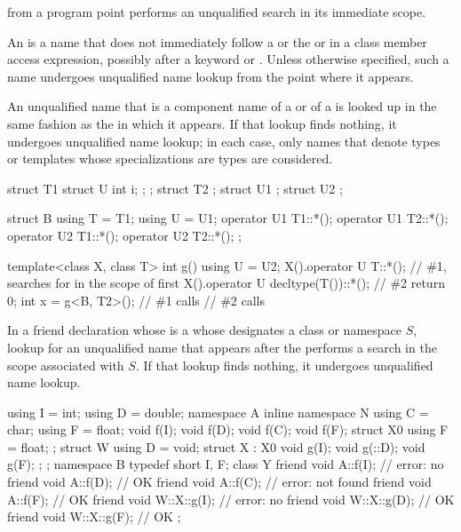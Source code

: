 \pnum
{}
from a program point performs an unqualified search in its immediate scope.

\pnum
An  is a name
that does not immediately follow a  or
the  or \tcode{->} in a class member access expression,
possibly after a  keyword or \tcode{\~}.
Unless otherwise specified,
such a name undergoes unqualified name lookup from the point where it appears.

\pnum
An unqualified name that is a component name of
a  or  of
a  is looked up in the same fashion
as the  in which it appears.
If that lookup finds nothing, it undergoes unqualified name lookup;
in each case, only names
that denote types or templates whose specializations are types are considered.
\begin{example}
\begin{codeblock}
struct T1 { struct U { int i; }; };
struct T2 { };
struct U1 {};
struct U2 {};

struct B {
  using T = T1;
  using U = U1;
  operator U1 T1::*();
  operator U1 T2::*();
  operator U2 T1::*();
  operator U2 T2::*();
};

template<class X, class T>
int g() {
  using U = U2;
  X().operator U T::*();                // \#1, searches for  in the scope of  first
  X().operator U decltype(T())::*();    // \#2
  return 0;
}
int x = g<B, T2>();                     // \#1 calls 
                                        // \#2 calls 
\end{codeblock}
\end{example}

\pnum
In a friend declaration 
whose  is a 
whose 
designates a class or namespace $S$,
lookup for an unqualified name
that appears after the 
performs a search in the scope associated with $S$.
If that lookup finds nothing, it undergoes unqualified name lookup.
\begin{example}
\begin{codeblock}
using I = int;
using D = double;
namespace A {
  inline namespace N {using C = char; }
  using F = float;
  void f(I);
  void f(D);
  void f(C);
  void f(F);
}
struct X0 {using F = float; };
struct W {
  using D = void;
  struct X : X0 {
    void g(I);
    void g(::D);
    void g(F);
  };
};
namespace B {
  typedef short I, F;
  class Y {
    friend void A::f(I);        // error: no 
    friend void A::f(D);        // OK
    friend void A::f(C);        // error:  not found
    friend void A::f(F);        // OK
    friend void W::X::g(I);     // error: no 
    friend void W::X::g(D);     // OK
    friend void W::X::g(F);     // OK
  };
}
\end{codeblock}
\end{example}

